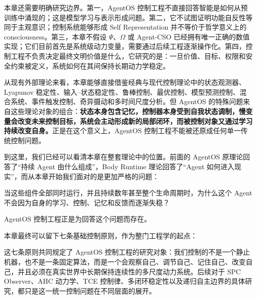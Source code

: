 本章还需要明确研究边界。第一，AgentOS 控制工程不直接回答智能是如何从预训练中涌现的；这是模型学习与表示形成问题。第二，它不试图证明功能自反性等同于主观意识；控制系统能够形成 Self Representation 并不等价于哲学意义上的 consciousness。第三，本章不假设 $\Psi$、$\Omega$ 或 Agent-CSO 已经拥有唯一正确的数值实现；它们目前首先是系统级动力变量，需要通过后续工程逐渐操作化。第四，控制工程不负责决定最终文明价值是什么，它研究的是：一旦价值、目标、权限和安全约束被定义，系统如何在其间保持长期动力学稳定。

从现有外部理论来看，本章能够直接借鉴经典与现代控制理论中的状态观测器、Lyapunov 稳定性、输入--状态稳定性、鲁棒控制、最优控制、模型预测控制、混合系统、事件触发控制、奇异摄动和多时间尺度分析。但 AgentOS 的特殊问题来自这些理论对象的组合：\textbf{状态本身包含记忆，控制器本身受到自我状态调制，慢变量会改变未来控制目标，系统会主动形成新的局部闭环，而被控制对象又通过学习持续改变自身。}正是在这个意义上，AgentOS 控制工程不能被还原成任何单一传统控制问题。

到这里，我们已经可以看清本章在整套理论中的位置。前面的 AgentOS 原理论回答了“持续 Agent 由什么组成”，Body Runtime 理论回答了“Agent 如何进入现实”，而从本章开始我们面对的是更加严格的问题：

\begin{statementbox}
当这些组件全部同时运行，并且持续数年甚至整个生命周期时，为什么这个 Agent 不会因为自身的学习、控制、记忆和反馈而逐渐失稳？
\end{statementbox}

AgentOS 控制工程正是为回答这个问题而存在。

本章最终可以留下七条基础控制原则，作为整门工程学的起点：
\begin{statementbox}
\centering
{}
\end{statementbox}

这七条原则共同规定了 AgentOS 控制工程的研究对象：我们控制的不是一个静止机器，也不是一条固定算法，而是一个会观察自己、调节自己、记住自己、改变自己，并且必须在真实世界中长期保持连续性的多尺度动力系统。后续对于 SPC Observer、AHC 动力学、TCE 控制律、多闭环稳定性以及递归自主边界的具体研究，都只是这一统一控制问题在不同层面的展开。
